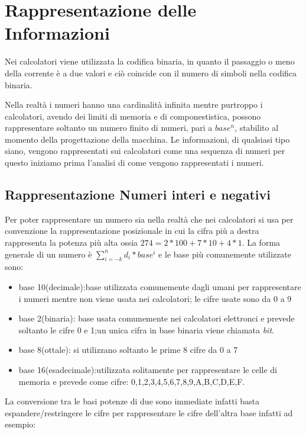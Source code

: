 \chapter{Rappresentazione delle Informazioni}
Nei calcolatori viene utilizzata la codifica binaria, in quanto il passaggio o meno
della corrente è a due valori e ciò coincide con il numero di simboli nella codifica binaria.

Nella realtà i numeri hanno una cardinalità infinita mentre purtroppo i calcolatori,
avendo dei limiti di memoria e di componestistica, possono rappresentare soltanto
un numero finito di numeri, pari a $base ^ n$, stabilito al momento della progettazione della macchina.
Le informazioni, di qualsiasi tipo siano, vengono rappresentati sui calcolatori
come una sequenza di numeri per questo iniziamo prima l'analisi di come vengono rappresentati i numeri.

\section{Rappresentazione Numeri interi e negativi}
Per poter rappresentare un numero sia nella realtà che nei calcolatori si usa per
convenzione la rappresentazione posizionale in cui la cifra più a destra rappresenta
la potenza più alta ossia $274 = 2 * 100 + 7 * 10 + 4 * 1$.\newline
La forma generale di un numero è $\displaystyle \sum _{i=-k} ^ n d_i * base^i$ e le base più comunemente
utilizzate sono:
\begin{itemize}
  \item base 10(decimale):base utilizzata comunemente dagli umani per rappresentare
        i numeri mentre non viene usata nei calcolatori; le cifre usate sono da 0 a 9
  \item base 2(binaria): base usata comunemente nei calcolatori elettronci e prevede
        soltanto le cifre 0 e 1;un unica cifra in base binaria viene chiamata \emph{bit}.
  \item base 8(ottale): si utilizzano soltanto le prime 8 cifre da 0 a 7
  \item base 16(esadecimale):utilizzata solitamente per rappresentare le celle di memoria e
        prevede come cifre: 0,1,2,3,4,5,6,7,8,9,A,B,C,D,E,F.
\end{itemize}


La conversione tra le basi potenze di due sono immediate infatti basta espandere/restringere
le cifre per rappresentare le cifre dell'altra base infatti ad esempio:


